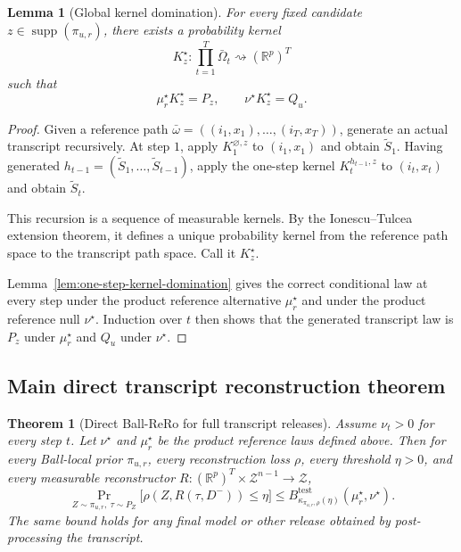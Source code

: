 \documentclass[conference,compsoc]{IEEEtran}
\newtheorem{theorem}{Theorem}
\newtheorem{lemma}{Lemma}
\DeclareMathOperator{\supp}{supp}
\newcommand{\R}{\mathbb{R}}
\newcommand{\cZ}{\mathcal{Z}}
\begin{document}
\begin{lemma}[Global kernel domination]
\label{lem:global-kernel-domination}
For every fixed candidate $z\in\supp(\pi_{u,r})$, there exists a probability kernel
\[
K_z^\star:\prod_{t=1}^T\bar\Omega_t\rightsquigarrow(\R^p)^T
\]
such that
\[
\mu_r^\star K_z^\star=P_z,
\qquad
\nu^\star K_z^\star=Q_u.
\]
\end{lemma}

\begin{proof}
Given a reference path $\bar\omega=((i_1,x_1),\ldots,(i_T,x_T))$, generate an actual transcript recursively. At step $1$, apply $K_1^{\varnothing,z}$ to $(i_1,x_1)$ and obtain $\widetilde S_1$. Having generated $h_{t-1}=(\widetilde S_1,\ldots,\widetilde S_{t-1})$, apply the one-step kernel $K_t^{h_{t-1},z}$ to $(i_t,x_t)$ and obtain $\widetilde S_t$.

This recursion is a sequence of measurable kernels. By the Ionescu--Tulcea extension theorem, it defines a unique probability kernel from the reference path space to the transcript path space. Call it $K_z^\star$.

Lemma~\ref{lem:one-step-kernel-domination} gives the correct conditional law at every step under the product reference alternative $\mu_r^\star$ and under the product reference null $\nu^\star$. Induction over $t$ then shows that the generated transcript law is $P_z$ under $\mu_r^\star$ and $Q_u$ under $\nu^\star$.
\end{proof}

\subsection{Main direct transcript reconstruction theorem}

\begin{theorem}[Direct Ball-ReRo for full transcript releases]
\label{thm:direct-transcript-rero}
Assume $\nu_t>0$ for every step $t$. Let $\nu^\star$ and $\mu_r^\star$ be the product reference laws defined above. Then for every Ball-local prior $\pi_{u,r}$, every reconstruction loss $\rho$, every threshold $\eta>0$, and every measurable reconstructor $R:(\R^p)^T\times\cZ^{n-1}\to\cZ$,
\[
\Pr_{Z\sim\pi_{u,r},\ \tau\sim P_Z}
\bigl[\rho(Z,R(\tau,D^-))\le\eta\bigr]
\le
B_{\kappa_{\pi_{u,r},\rho}(\eta)}^{\mathrm{test}}(\mu_r^\star,\nu^\star).
\]
The same bound holds for any final model or other release obtained by post-processing the transcript.
\end{theorem}
\end{document}
